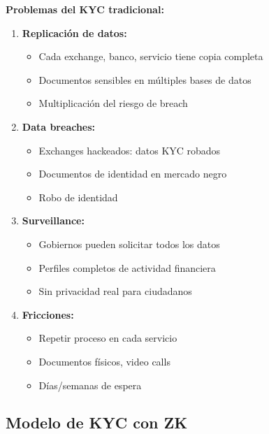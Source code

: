 \documentclass[11pt,a4paper,twoside]{book}
\theoremstyle{definition}
\theoremstyle{remark}
\begin{document}
\begin{advertencia}
\textbf{Problemas del KYC tradicional:}

\begin{enumerate}
    \item \textbf{Replicación de datos:}
    \begin{itemize}
        \item Cada exchange, banco, servicio tiene copia completa
        \item Documentos sensibles en múltiples bases de datos
        \item Multiplicación del riesgo de breach
    \end{itemize}
    
    \item \textbf{Data breaches:}
    \begin{itemize}
        \item Exchanges hackeados: datos KYC robados
        \item Documentos de identidad en mercado negro
        \item Robo de identidad
    \end{itemize}
    
    \item \textbf{Surveillance:}
    \begin{itemize}
        \item Gobiernos pueden solicitar todos los datos
        \item Perfiles completos de actividad financiera
        \item Sin privacidad real para ciudadanos
    \end{itemize}
    
    \item \textbf{Fricciones:}
    \begin{itemize}
        \item Repetir proceso en cada servicio
        \item Documentos físicos, video calls
        \item Días/semanas de espera
    \end{itemize}
\end{enumerate}
\end{advertencia}

\subsection{Modelo de KYC con ZK}
\end{document}
